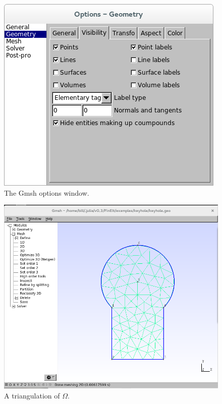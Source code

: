 \documentclass[a4paper,12pt]{article}
\begin{document}
\begin{figure}
\caption{The Gmsh options window.}
\label{fig: options}
\begin{center}
\includegraphics[scale=0.4]{images/options.png}
\end{center}
\end{figure}

\begin{figure}
\caption{A triangulation of $\Omega$.}
\label{fig: triangulation}
\begin{center}
\includegraphics[scale=0.4]{images/triangulation.png}
\end{center}
\end{figure}
\end{document}
